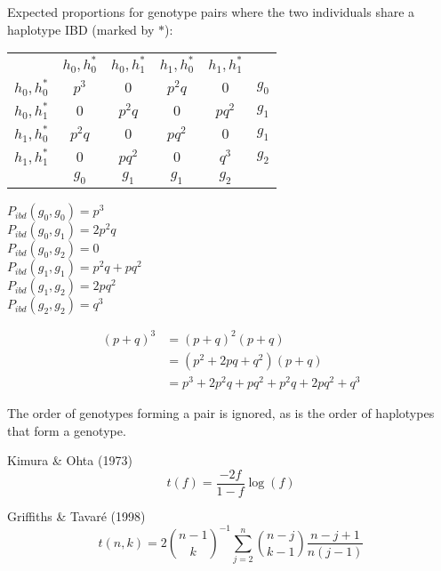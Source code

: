 Expected proportions for genotype pairs where the two individuals share a haplotype IBD (marked by $*$):

\hfill \break%
\begin{minipage}{0.65\textwidth}
\begin{tabular}[t]{c|c|c|c|c|c}
\multicolumn{1}{c}{\rule[-1.5ex]{0pt}{0pt}} &
\multicolumn{1}{c}{$h_{0}, h^*_{0}$} &
\multicolumn{1}{c}{$h_{0}, h^*_{1}$} &
\multicolumn{1}{c}{$h_{1}, h^*_{0}$} &
\multicolumn{1}{c}{$h_{1}, h^*_{1}$} &
\multicolumn{1}{c}{} \\ \cline{2-5}
\rule{0pt}{3ex}\rule[-1.5ex]{0pt}{0pt}
  $h_{0}, h^*_{0}$    &  $p^{3}$   &  $0$       &  $p^{2}q$  &  $0$       &    $g_{0}$  \\ \cline{2-5}
\rule{0pt}{3ex}\rule[-1.5ex]{0pt}{0pt}
  $h_{0}, h^*_{1}$    &  $0$       &  $p^{2}q$  &  $0$       &  $pq^{2}$  &    $g_{1}$  \\ \cline{2-5}
\rule{0pt}{3ex}\rule[-1.5ex]{0pt}{0pt}
  $h_{1}, h^*_{0}$    &  $p^{2}q$  &  $0$       &  $pq^{2}$  &  $0$       &    $g_{1}$  \\ \cline{2-5}
\rule{0pt}{3ex}\rule[-1.5ex]{0pt}{0pt}
  $h_{1}, h^*_{1}$    &  $0$       &  $pq^{2}$  &  $0$       &  $q^{3}$   &    $g_{2}$  \\ \cline{2-5}
\multicolumn{1}{c}{} &
\multicolumn{1}{c}{$g_{0}$} &
\multicolumn{1}{c}{$g_{1}$} &
\multicolumn{1}{c}{$g_{1}$} &
\multicolumn{1}{c}{$g_{2}$} &
\multicolumn{1}{c}{}
\end{tabular}
\end{minipage}
\begin{minipage}{0.35\textwidth}
\begin{flushleft}
$P_{ibd}(g_{0}, g_{0}) = p^{3} $           \\[1.5ex]
$P_{ibd}(g_{0}, g_{1}) = 2p^{2}q $         \\[1.5ex]
$P_{ibd}(g_{0}, g_{2}) = 0 $               \\[1.5ex]
$P_{ibd}(g_{1}, g_{1}) = p^{2}q + pq^{2} $ \\[1.5ex]
$P_{ibd}(g_{1}, g_{2}) = 2pq^{2} $         \\[1.5ex]
$P_{ibd}(g_{2}, g_{2}) = q^{3} $
\end{flushleft}
\end{minipage}

\[
\begin{split}
(p+q)^{3}	& = (p+q)^{2} (p+q) \\
  			& = (p^2 + 2pq + q^2) (p+q) \\
  			& = p^{3} + 2p^{2}q + pq^{2} + p^{2}q  + 2pq^{2} + q^{3}
\end{split}
\]


The order of genotypes forming a pair is ignored, as is the order of haplotypes that form a genotype. %


\newpage


Kimura \& Ohta (1973)
\[
t(f) = \frac{-2f}{1-f}\log(f)
\]

Griffiths \& Tavaré (1998)
\[
t(n, k) = 2 {n-1 \choose k}^{-1} \sum_{j=2}^{n} {n-j \choose k-1} \frac{n-j+1}{n(j-1)}
\]
